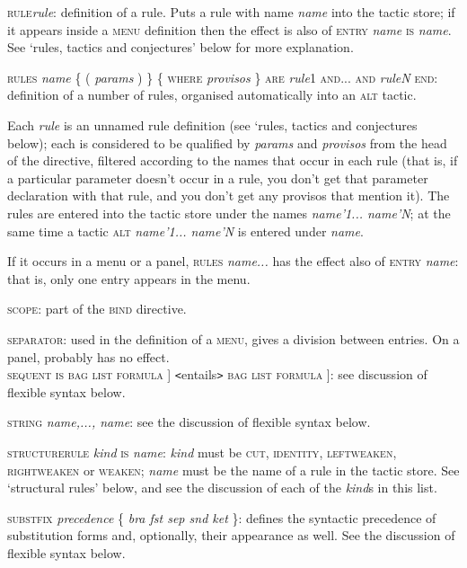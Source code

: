 \documentclass[11pt]{book}
\newcommand{\tab}{\hspace{5mm}}
\begin{document}
\textsc{rule{\nobreakspace}}\textit{rule}: definition of a rule. Puts a rule with name \textit{name} into the tactic store; if it appears inside a \textsc{menu} definition then the effect is also of \textsc{entry} \textit{name} \textsc{is} \textit{name}. See `rules, tactics and conjectures' below for more explanation.


\textsc{rules} \textit{name} \{ ( \textit{params} ) \} \{ \textsc{where} \textit{provisos} \} \textsc{are} \textit{rule}1 \textsc{and... and} \textit{ruleN} \textsc{end}: definition of a number of rules, organised automatically into an \textsc{alt} tactic.


\tab Each \textit{rule} is an unnamed rule definition (see `rules, tactics and conjectures below); each is considered to be qualified by \textit{params} and \textit{provisos} from the head of the directive, filtered according to the names that occur in each rule (that is, if a particular parameter doesn't occur in a rule, you don't get that parameter declaration with that rule, and you don't get any provisos that mention it). The rules are entered into the tactic store under the names \textit{name'1... name'N}; at the same time a tactic \textsc{alt} \textit{name'1... name'N} is entered under \textit{name}.


\tab If it occurs in a menu or a panel, \textsc{rules} \textit{name...} has the effect also of \textsc{entry} \textit{name}: that is, only one entry appears in the menu.


\textsc{scope}: part of the \textsc{bind} directive.


\textsc{separator}: used in the definition of a \textsc{menu}, gives a division between entries. On a panel, probably has no effect.\\
\textsc{sequent is}  \textsc{bag} {\textbar} \textsc{list} {\textbar} \textsc{formula} ] \texttt{<}entails\texttt{>} \textsc{bag} {\textbar} \textsc{list} {\textbar} \textsc{formula} ]: see discussion of flexible syntax below.


\textsc{string} \textit{name,..., name}: see the discussion of flexible syntax below.


\textsc{structurerule} \textit{kind} \textsc{is} \textit{name}: \textit{kind} must be \textsc{cut}, \textsc{identity}, \textsc{leftweaken, rightweaken} or \textsc{weaken}; \textit{name} must be the name of a rule in the tactic store. See `structural rules' below, and see the discussion of each of the \textit{kind}s in this list.


\textsc{substfix} \textit{precedence} \{ \textit{bra fst sep snd ket} \}: defines the syntactic precedence of substitution forms and, optionally, their appearance as well. See the discussion of flexible syntax below.
\end{document}
